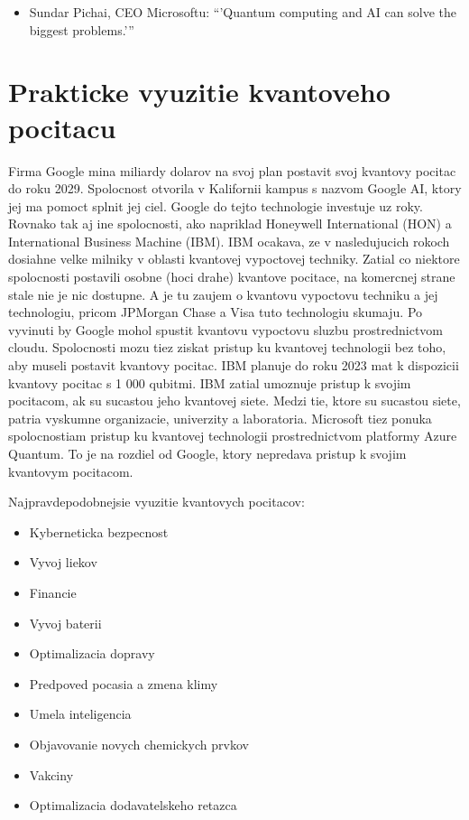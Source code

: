 \documentclass[year=2021]{article}
\begin{document}
\begin{itemize}
\item Sundar Pichai, CEO Microsoftu: \enquote{'Quantum computing and AI can solve the biggest problems.'}
\end{itemize}
\section{Prakticke vyuzitie kvantoveho pocitacu}
Firma Google mina miliardy dolarov na svoj plan postavit svoj kvantovy pocitac do roku 2029. Spolocnost otvorila v Kalifornii kampus s nazvom Google AI, ktory jej ma pomoct splnit jej ciel. Google do tejto technologie investuje uz roky. Rovnako tak aj ine spolocnosti, ako napriklad Honeywell International (HON) a International Business Machine (IBM). IBM ocakava, ze v nasledujucich rokoch dosiahne velke milniky v oblasti kvantovej vypoctovej techniky.
\bigbreak
Zatial co niektore spolocnosti postavili osobne (hoci drahe) kvantove pocitace, na komercnej strane stale nie je nic dostupne. A je tu zaujem o kvantovu vypoctovu techniku   a jej technologiu, pricom JPMorgan Chase a Visa tuto technologiu skumaju. Po vyvinuti by Google mohol spustit kvantovu vypoctovu sluzbu prostrednictvom cloudu.
\bigbreak
Spolocnosti mozu tiez ziskat pristup ku kvantovej technologii bez toho, aby museli postavit kvantovy pocitac. IBM planuje do roku 2023 mat k dispozicii kvantovy pocitac s 1 000 qubitmi. IBM zatial umoznuje pristup k svojim pocitacom, ak su sucastou jeho kvantovej siete. Medzi tie, ktore su sucastou siete, patria vyskumne organizacie, univerzity a laboratoria.
\bigbreak
Microsoft tiez ponuka spolocnostiam pristup ku kvantovej technologii prostrednictvom platformy Azure Quantum. To je na rozdiel od Google, ktory nepredava pristup k svojim kvantovym pocitacom.

\bigbreak
Najpravdepodobnejsie vyuzitie kvantovych pocitacov:
\begin{itemize}
\item Kyberneticka bezpecnost
\item Vyvoj liekov
\item Financie
\item Vyvoj baterii
\item Optimalizacia dopravy
\item Predpoved pocasia a zmena klimy
\item Umela inteligencia
\item Objavovanie novych chemickych prvkov
\item Vakciny
\item Optimalizacia dodavatelskeho retazca
\end{itemize}
\end{document}

